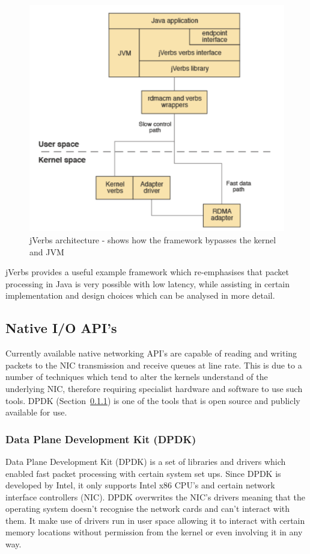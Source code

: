 \documentclass[final_report.tex]{subfiles}
\begin{document}
\begin{figure}[H]
	\centering
	\includegraphics[width=\textwidth]{img/jverbs.png}
	\caption{jVerbs architecture - shows how the framework bypasses the kernel and JVM \cite{ibm_jverbs}}
	\label{fig:jverb}
\end{figure}

jVerbs provides a useful example framework which re-emphasises that packet processing in Java is very possible with low latency, while assisting in certain implementation and design choices which can be analysed in more detail.

\subsection{Native I/O API's}
Currently available native networking API's are capable of reading and writing packets to the NIC transmission and receive queues at line rate. This is due to a number of techniques which tend to alter the kernels understand of the underlying NIC, therefore requiring specialist hardware and software to use such tools. DPDK (Section~\ref{subsec:dpdk}) is one of the tools that is open source and publicly available for use.

\subsubsection{Data Plane Development Kit (DPDK)}
\label{subsec:dpdk}
Data Plane Development Kit (DPDK) \cite{dpdk} is a set of libraries and drivers which enabled fast packet processing with certain system set ups. Since DPDK is developed by Intel, it only supports Intel x86 CPU's and certain network interface controllers (NIC). DPDK overwrites the NIC's drivers meaning that the operating system doesn't recognise the network cards and can't interact with them. It make use of drivers run in user space allowing it to interact with certain memory locations without permission from the kernel or even involving it in any way.
\end{document}
